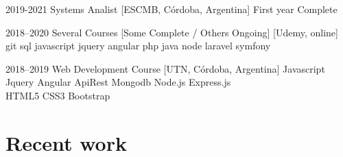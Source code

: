 \begin{twenty} %
        \twentyitem%
        {2019-2021}
        {Systems Analist}
        {[ESCMB, Córdoba, Argentina]}
        {First year Complete}
        
        \twentyitem%
        {2018--2020}
        {Several Courses [Some Complete / Others Ongoing]}
        {[Udemy, online]}
        {git sql javascript jquery angular php java node laravel symfony}
 	
 	\twentyitem%
 	{2018--2019}
 	{Web Development Course}
 	{[UTN, Córdoba, Argentina]}
 	{Javascript Jquery Angular ApiRest Mongodb Node.js Express.js\\
 	HTML5 CSS3 Bootstrap}
\end{twenty}

\section{Recent work}

